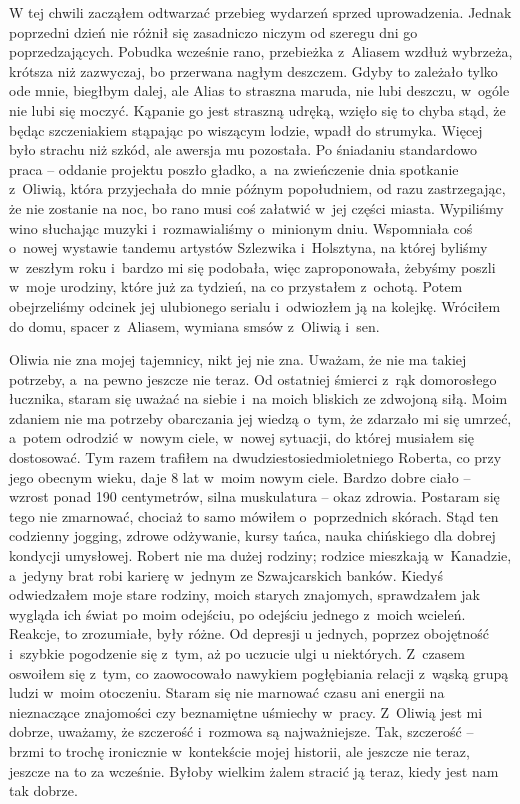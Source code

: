 W tej chwili zacząłem odtwarzać przebieg wydarzeń sprzed uprowadzenia. Jednak poprzedni dzień nie różnił się zasadniczo niczym od szeregu dni go poprzedzających. Pobudka wcześnie rano, przebieżka z~Aliasem wzdłuż wybrzeża, krótsza niż zazwyczaj, bo przerwana nagłym deszczem. Gdyby to zależało tylko ode mnie, biegłbym dalej, ale Alias to straszna maruda, nie lubi deszczu, w~ogóle nie lubi się moczyć. Kąpanie go jest straszną udręką, wzięło się to chyba stąd, że będąc szczeniakiem stąpając po wiszącym lodzie, wpadł do strumyka. Więcej było strachu niż szkód, ale awersja mu pozostała. Po śniadaniu standardowo praca -- oddanie projektu poszło gładko, a~na zwieńczenie dnia spotkanie z~Oliwią, która przyjechała do mnie późnym popołudniem, od razu zastrzegając, że nie zostanie na noc, bo rano musi coś załatwić w~jej części miasta. Wypiliśmy wino słuchając muzyki i~rozmawialiśmy o~minionym dniu. Wspomniała coś o~nowej wystawie tandemu artystów Szlezwika i~Holsztyna, na której byliśmy w~zeszłym roku i~bardzo mi się podobała, więc zaproponowała, żebyśmy poszli w~moje urodziny, które już za tydzień, na co przystałem z~ochotą. Potem obejrzeliśmy odcinek jej ulubionego serialu i~odwiozłem ją na kolejkę. Wróciłem do domu, spacer z~Aliasem, wymiana smsów z~Oliwią i~sen.

Oliwia nie zna mojej tajemnicy, nikt jej nie zna. Uważam, że nie ma takiej potrzeby, a~na pewno jeszcze nie teraz. Od ostatniej śmierci z~rąk domorosłego łucznika, staram się uważać na siebie i~na moich bliskich ze zdwojoną siłą. Moim zdaniem nie ma potrzeby obarczania jej wiedzą o~tym, że zdarzało mi się umrzeć, a~potem odrodzić w~nowym ciele, w~nowej sytuacji, do której musiałem się dostosować. Tym razem trafiłem na dwudziestosiedmioletniego Roberta, co przy jego obecnym wieku, daje 8 lat w~moim nowym ciele. Bardzo dobre ciało -- wzrost ponad 190 centymetrów, silna muskulatura -- okaz zdrowia. Postaram się tego nie zmarnować, chociaż to samo mówiłem o~poprzednich skórach. Stąd ten codzienny jogging, zdrowe odżywanie, kursy tańca, nauka chińskiego dla dobrej kondycji umysłowej. Robert nie ma dużej rodziny; rodzice mieszkają w~Kanadzie, a~jedyny brat robi karierę w~jednym ze Szwajcarskich banków. Kiedyś odwiedzałem moje stare rodziny, moich starych znajomych, sprawdzałem jak wygląda ich świat po moim odejściu, po odejściu jednego z~moich wcieleń. Reakcje, to zrozumiałe, były różne. Od depresji u jednych, poprzez obojętność i~szybkie pogodzenie się z~tym, aż po uczucie ulgi u niektórych. Z~czasem oswoiłem się z~tym, co zaowocowało nawykiem pogłębiania relacji z~wąską grupą ludzi w~moim otoczeniu. Staram się nie marnować czasu ani energii na nieznaczące znajomości czy beznamiętne uśmiechy w~pracy. Z~Oliwią jest mi dobrze, uważamy, że szczerość i~rozmowa są najważniejsze. Tak, szczerość -- brzmi to trochę ironicznie w~kontekście mojej historii, ale jeszcze nie teraz, jeszcze na to za wcześnie. Byłoby wielkim żalem stracić ją teraz, kiedy jest nam tak dobrze.

